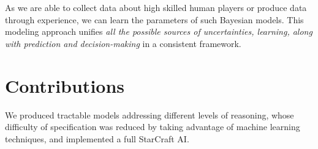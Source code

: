 As we are able to collect data about high skilled human players or produce data through experience, we can learn the parameters of such Bayesian models. This modeling approach unifies \textit{all the possible sources of uncertainties, learning, along with prediction and decision-making} in a consistent framework.

\section{Contributions}

We produced tractable models addressing different levels of reasoning, whose difficulty of specification was reduced by taking advantage of machine learning techniques, and implemented a full StarCraft AI.

